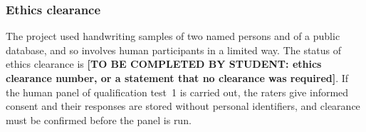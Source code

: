     \subsubsection{Ethics clearance}

        The project used handwriting samples of two named persons and of a public database, and so involves human participants in a limited way.
        The status of ethics clearance is \textbf{[TO BE COMPLETED BY STUDENT: ethics clearance number, or a statement that no clearance was required]}.
        If the human panel of qualification test~1 is carried out, the raters give informed consent and their responses are stored without personal identifiers, and clearance must be confirmed before the panel is run.

